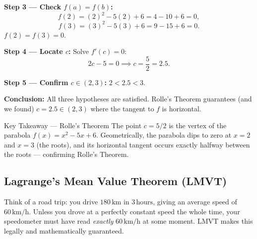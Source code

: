 \documentclass[12pt,a4paper]{article}
\begin{document}
\textbf{Step 3 --- Check $f(a) = f(b)$:}
\[
  f(2) = (2)^2 - 5(2) + 6 = 4 - 10 + 6 = 0,
\]
\[
  f(3) = (3)^2 - 5(3) + 6 = 9 - 15 + 6 = 0.
\]
$f(2) = f(3) = 0$. \checkmark

\textbf{Step 4 --- Locate $c$:} Solve $f'(c) = 0$:
\[
  2c - 5 = 0 \implies c = \frac{5}{2} = 2.5.
\]

\textbf{Step 5 --- Confirm $c \in (2, 3)$:}
$2 < 2.5 < 3$. \checkmark

\textbf{Conclusion:} All three hypotheses are satisfied. Rolle's Theorem guarantees (and we
found) $c = 2.5 \in (2, 3)$ where the tangent to $f$ is horizontal.

\begin{learnbox}{Key Takeaway --- Rolle's Theorem}
The point $c = 5/2$ is the vertex of the parabola $f(x) = x^2 - 5x + 6$.
Geometrically, the parabola dips to zero at $x=2$ and $x=3$ (the roots), and its
horizontal tangent occurs exactly halfway between the roots --- confirming Rolle's Theorem.
\end{learnbox}

\subsection{Lagrange's Mean Value Theorem (LMVT)}

Think of a road trip: you drive $180\,\text{km}$ in $3\,\text{hours}$, giving an average speed
of $60\,\text{km/h}$. Unless you drove at a perfectly constant speed the whole time, your
speedometer must have read \emph{exactly} $60\,\text{km/h}$ at some moment. LMVT makes this
legally and mathematically guaranteed.
\end{document}
